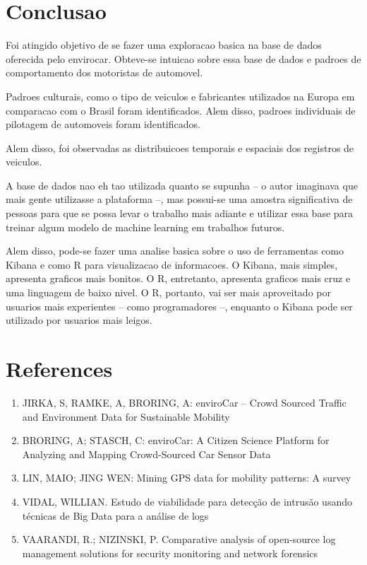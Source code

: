 \documentclass[10pt, conference]{IEEEtran}
\begin{document}
\section{Conclusao}
%

Foi atingido objetivo de se fazer uma exploracao basica na base de dados oferecida pelo envirocar. Obteve-se 
intuicao sobre essa base de dados e padroes de comportamento dos motoristas de automovel. 

Padroes culturais,
como o tipo de veiculos e fabricantes utilizados na Europa em comparacao com o Brasil foram identificados. 
Alem disso, padroes individuais de pilotagem de automoveis foram identificados. 

Alem disso, foi observadas as distribuicoes temporais e espaciais dos registros de veiculos.

A base de dados nao eh tao utilizada quanto se supunha -- o autor imaginava que mais gente utilizasse a
plataforma --, mas possui-se uma amostra significativa de pessoas para que se possa levar o trabalho
mais adiante e utilizar essa base para treinar algum modelo de machine learning em trabalhos futuros.

Alem disso, pode-se fazer uma analise basica sobre o uso de ferramentas como Kibana e como R para
visualizacao de informacoes. O Kibana, mais simples, apresenta graficos mais bonitos. O R, entretanto,
apresenta graficos mais cruz e uma linguagem de baixo nivel. O R, portanto, vai ser mais aproveitado
por usuarios mais experientes -- como programadores --, enquanto o Kibana pode ser utilizado por usuarios
mais leigos.



\iffinal
\section*{References}
%

\begin{enumerate}
  \item JIRKA, S, RAMKE, A, BRORING, A: enviroCar – Crowd Sourced Traffic and Environment Data for Sustainable Mobility
  \item BRORING, A; STASCH, C: enviroCar:  A Citizen Science Platform  for Analyzing and Mapping Crowd-Sourced Car Sensor  Data
  \item LIN, MAIO; JING WEN: Mining GPS data  for mobility  patterns: A survey
  \item VIDAL, WILLIAN. Estudo de viabilidade para detecção de intrusão usando técnicas de Big Data para a análise de logs
  \item VAARANDI, R.; NIZINSKI, P. Comparative analysis of open-source log management solutions for security monitoring and network forensics
\end{enumerate}
\end{document}

